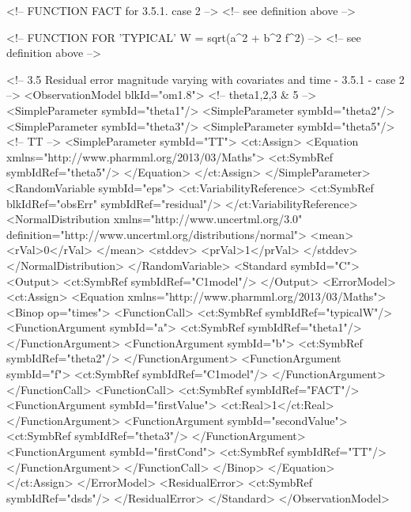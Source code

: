 \documentclass[a4paper,10pt]{article}
\begin{document}
\begin{xmlcode}
<!-- FUNCTION FACT for 3.5.1. case 2 -->
<!-- see definition above  -->

<!-- FUNCTION FOR 'TYPICAL' W = sqrt(a^2 + b^2 f^2) -->
<!-- see definition above  -->


<!-- 3.5 Residual error magnitude varying with covariates and time - 3.5.1 - case 2 -->
<ObservationModel blkId="om1.8">
    <!-- theta1,2,3 & 5 -->
    <SimpleParameter symbId="theta1"/>
    <SimpleParameter symbId="theta2"/>
    <SimpleParameter symbId="theta3"/>
    <SimpleParameter symbId="theta5"/>
    <!-- TT -->
    <SimpleParameter symbId="TT">
        <ct:Assign>
            <Equation xmlns="http://www.pharmml.org/2013/03/Maths">
                <ct:SymbRef symbIdRef="theta5"/>
            </Equation>
        </ct:Assign>
    </SimpleParameter>
    <RandomVariable symbId="eps">
        <ct:VariabilityReference>
            <ct:SymbRef blkIdRef="obsErr" symbIdRef="residual"/>
        </ct:VariabilityReference>
        <NormalDistribution xmlns="http://www.uncertml.org/3.0" definition="http://www.uncertml.org/distributions/normal">
            <mean>
                <rVal>0</rVal>
            </mean>
            <stddev>
                <prVal>1</prVal>
            </stddev>
        </NormalDistribution>
    </RandomVariable>
    <Standard symbId="C">
        <Output>
            <ct:SymbRef symbIdRef="C1model"/>
        </Output>
        <ErrorModel>
            <ct:Assign>
                <Equation xmlns="http://www.pharmml.org/2013/03/Maths">
                    <Binop op="times">
                        <FunctionCall>
                            <ct:SymbRef symbIdRef="typicalW"/>
                            <FunctionArgument symbId="a">
                                <ct:SymbRef symbIdRef="theta1"/>
                            </FunctionArgument>
                            <FunctionArgument symbId="b">
                                <ct:SymbRef symbIdRef="theta2"/>
                            </FunctionArgument>
                            <FunctionArgument symbId="f">
                                <ct:SymbRef symbIdRef="C1model"/>
                            </FunctionArgument>
                        </FunctionCall>
                        <FunctionCall>
                            <ct:SymbRef symbIdRef="FACT"/>
                            <FunctionArgument symbId="firstValue">
                                <ct:Real>1</ct:Real>
                            </FunctionArgument>
                            <FunctionArgument symbId="secondValue">
                                <ct:SymbRef symbIdRef="theta3"/>
                            </FunctionArgument>
                            <FunctionArgument symbId="firstCond">
                                <ct:SymbRef symbIdRef="TT"/>
                            </FunctionArgument>
                        </FunctionCall>
                    </Binop>
                </Equation>
            </ct:Assign>
        </ErrorModel>
        <ResidualError>
            <ct:SymbRef symbIdRef="dsds"/>
        </ResidualError>
    </Standard>
</ObservationModel>
\end{xmlcode}
\end{document}
